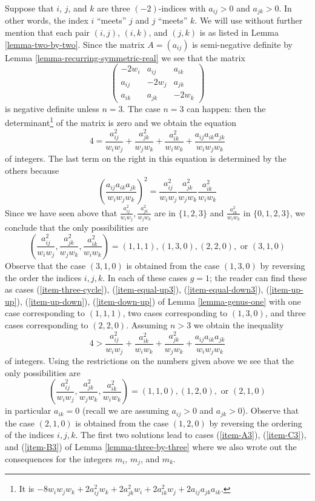 \documentclass{stacks-project}
\theoremstyle{plain}
\theoremstyle{definition}
\theoremstyle{remark}
\numberwithin{equation}{subsection}
\begin{document}
\noindent
Suppose that $i$, $j$, and $k$ are three $(-2)$-indices with $a_{ij} > 0$
and $a_{jk} > 0$.  In other words, the index $i$ ``meets'' $j$ and
$j$ ``meets'' $k$. We will use without further mention that each pair
$(i, j)$, $(i, k)$, and $(j, k)$ is as listed in Lemma \ref{lemma-two-by-two}.
Since the matrix $A = (a_{ij})$ is semi-negative
definite by Lemma \ref{lemma-recurring-symmetric-real} we see that the matrix
$$
\left(
\begin{matrix}
-2w_i & a_{ij} & a_{ik} \\
a_{ij} & -2w_j & a_{jk} \\
a_{ik} & a_{jk} & -2w_k
\end{matrix}
\right)
$$
is negative definite unless $n = 3$. The case $n = 3$ can happen:
then the determinant\footnote{It is
$-8w_iw_jw_k + 2a_{ij}^2w_k + 2a_{jk}^2w_i + 2a_{ik}^2w_j +
2a_{ij}a_{jk}a_{ik}$.} of the matrix is zero
and we obtain the equation
$$
4 = \frac{a_{ij}^2}{w_iw_j} +
\frac{a_{jk}^2}{w_jw_k} +
\frac{a_{ik}^2}{w_iw_k} +
\frac{a_{ij}a_{ik}a_{jk}}{w_iw_jw_k}
$$
of integers. The last term on the right in this equation is determined
by the others because
$$
\left(\frac{a_{ij}a_{ik}a_{jk}}{w_iw_jw_k}\right)^2 =
\frac{a_{ij}^2}{w_iw_j} \frac{a_{jk}^2}{w_jw_k} \frac{a_{ik}^2}{w_iw_k}
$$
Since we have seen above that
$\frac{a_{ij}^2}{w_iw_j}, \frac{a_{jk}^2}{w_jw_k}$ are in
$\{1, 2, 3\}$ and $\frac{a_{ik}^2}{w_iw_k}$ in $\{0, 1, 2, 3\}$,
we conclude that the only possibilities are
$$
(\frac{a_{ij}^2}{w_iw_j}, \frac{a_{jk}^2}{w_jw_k}, \frac{a_{ik}^2}{w_iw_k}) =
(1, 1, 1), (1, 3, 0), (2, 2, 0),\text{ or } (3, 1, 0)
$$
Observe that the case $(3, 1, 0)$ is obtained from the case $(1, 3, 0)$
by reversing the order the indices $i, j, k$.
In each of these cases $g = 1$; the reader can find these as cases
(\ref{item-three-cycle}), (\ref{item-equal-up3}), (\ref{item-equal-down3}),
(\ref{item-up-up}), (\ref{item-up-down}), (\ref{item-down-up}) of
Lemma \ref{lemma-genus-one}
with one case corresponding to $(1, 1, 1)$,
two cases corresponding to $(1, 3, 0)$, and
three cases corresponding to $(2, 2, 0)$.
Assuming $n > 3$
we obtain the inequality
$$
4 > \frac{a_{ij}^2}{w_iw_j} + \frac{a_{ik}^2}{w_iw_k} +
\frac{a_{jk}^2}{w_jw_k} + \frac{a_{ij}a_{ik}a_{jk}}{w_iw_jw_k}
$$
of integers. Using the restrictions on the numbers given above
we see that the only possibilities are
$$
(\frac{a_{ij}^2}{w_iw_j}, \frac{a_{jk}^2}{w_jw_k}, \frac{a_{ik}^2}{w_iw_k}) =
(1, 1, 0), (1, 2, 0),\text{ or }(2, 1, 0)
$$
in particular $a_{ik} = 0$ (recall we are assuming
$a_{ij} > 0$ and $a_{jk} > 0$). Observe that the case
$(2, 1, 0)$ is obtained from the case $(1, 2, 0)$ by reversing
the ordering of the indices $i, j, k$. The first two solutions lead
to cases (\ref{item-A3}), (\ref{item-C3}), and (\ref{item-B3})
of Lemma \ref{lemma-three-by-three} where we also wrote out the consequences
for the integers $m_i$, $m_j$, and $m_k$.
\end{document}

